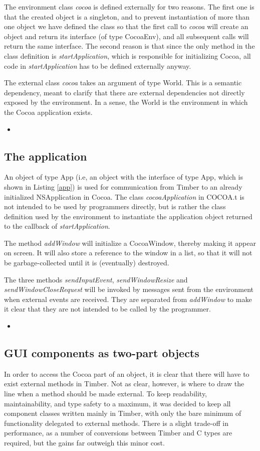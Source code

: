 \documentclass[a4paper]{article}
\newcommand{\timbercode}[2]
  {\begin{itemize}\item[]\end{itemize}}
\begin{document}
The environment class \textit{cocoa} is defined externally for two reasons. The first one is that the created object is a singleton, and to prevent instantiation of more than one object we have defined the class so that the first call to \textit{cocoa} will create an object and return its interface (of type CocoaEnv), and all subsequent calls will return the same interface. The second reason is that since the only method in the class definition is \textit{startApplication}, which is responsible for initializing Cocoa, all code in \textit{startApplication} has to be defined externally anyway.

The external class \textit{cocoa} takes an argument of type World. This is a semantic dependency, meant to clarify that there are external dependencies not directly exposed by the environment. In a sense, the World is the environment in which the Cocoa application exists.

\timbercode{cocoaEnv}{"CocoaEnv"}

\subsection{The application}
An object of type App (i.e, an object with the interface of type App, which is shown in Listing \ref{app}) is used for communication from Timber to an already initialized NSApplication in Cocoa. The class \textit{cocoaApplication} in COCOA.t is not intended to be used by programmers directly, but is rather the class definition used by the environment to instantiate the application object returned to the callback of \textit{startApplication}.

The method \textit{addWindow} will initialize a CocoaWindow, thereby making it appear on screen. It will also store a reference to the window in a list, so that it will not be garbage-collected until it is (eventually) destroyed.

The three methods \textit{sendInputEvent}, \textit{sendWindowResize} and \textit{sendWindowCloseRequest} will be invoked by messages sent from the environment when external events are received. They are separated from \textit{addWindow} to make it clear that they are not intended to be called by the programmer.

\timbercode{app}{"App"}

\subsection{GUI components as two-part objects}
In order to access the Cocoa part of an object, it is clear that there will have to exist external methods in Timber. Not as clear, however, is where to draw the line when a method should be made external. To keep readability, maintainability, and type safety to a maximum, it was decided to keep all component classes written mainly in Timber, with only the bare minimum of functionality delegated to external methods. There is a slight trade-off in performance, as a number of conversions between Timber and C types are required, but the gains far outweigh this minor cost.
\end{document}
